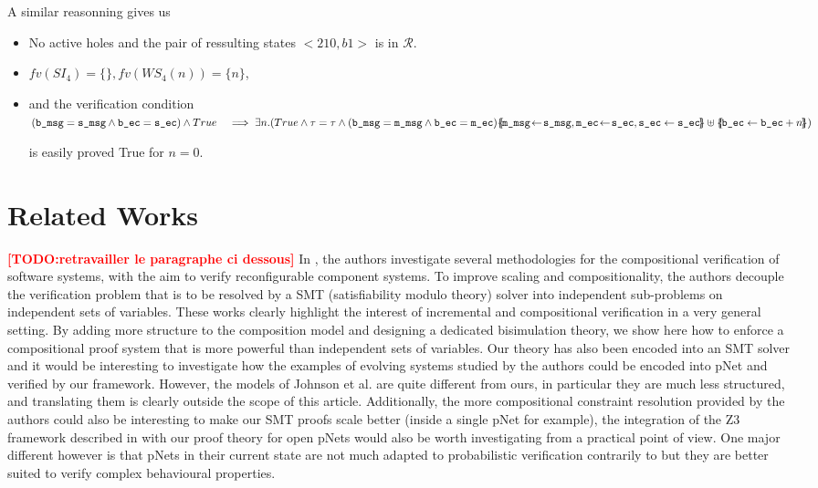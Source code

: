 \documentclass{lmcs}
\newcommand{\TODO}[1]{\textcolor{red}{\textbf{[TODO:#1]}}}
\begin{document}
  \medskip       A similar reasonning gives us
\begin{itemize}
  \item No active holes and the pair of ressulting states $<210,b1>$ is in $\mathcal{R}$.
\item $fv(SI_4) = \{\}, fv(WS_4(n)) = \{n\}$,
\item and the verification condition\\

         $(\texttt{b\_msg} = \texttt{s\_msg} \land \texttt{b\_ec} = \texttt{s\_ec}) \land True\hspace{3mm} \implies
\exists n.(True \land \tau=\tau \land \\ (\texttt{b\_msg} = \texttt{m\_msg} \land \texttt{b\_ec} = \texttt{m\_ec})  \subst{\texttt{m\_msg}\!\gets\! \texttt{s\_msg}, \texttt{m\_ec}\!\gets\! \texttt{s\_ec}, \texttt{s\_ec}\gets \texttt{s\_ec}}
\uplus \subst{\texttt{b\_ec}\gets \texttt{b\_ec}+n})
$

is easily proved True for $n=0$.
 \end{itemize}
      
\section{Related Works}\label{sec:RW}

\TODO{retravailler le paragraphe ci dessous}
In
\cite{Johnson:2013:CBSE,Johnson:2014:qosa}, the authors investigate several methodologies for the compositional verification of software systems, with the aim to verify reconfigurable component systems. To improve scaling and compositionality, the authors  decouple the verification problem that is to be resolved by a SMT (satisfiability modulo theory) solver into independent sub-problems on independent sets of variables. These works clearly highlight the interest of incremental and compositional verification in a very general setting. By adding more structure to the composition model and designing a dedicated bisimulation theory, we show here how to enforce a compositional proof system that is more powerful than independent sets of variables. Our theory has also been encoded into an SMT solver and it would be interesting to investigate how the examples of evolving systems studied by the authors could be encoded into pNet and verified by our framework. However, the models of Johnson et al. are quite different from ours, in particular they are much less structured, and translating them is clearly outside the scope of this article. Additionally, the more compositional constraint resolution provided by the authors could also be interesting to make our SMT proofs scale better (inside a single pNet for example), the integration of the Z3 framework described in \cite{Johnson:2014:qosa} with our proof theory for open pNets would also be worth investigating from a practical point of view. One major different however is that pNets in their current state are not much adapted to probabilistic verification contrarily to \cite{Johnson:2014:qosa} but they are better suited to verify complex behavioural properties.
\end{document}
